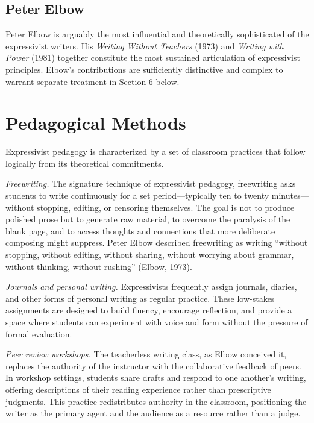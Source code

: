 \documentclass[12pt]{article}
\begin{document}
\subsection{Peter Elbow}

Peter Elbow is arguably the most influential and theoretically sophisticated of the expressivist writers. His \textit{Writing Without Teachers} (1973) and \textit{Writing with Power} (1981) together constitute the most sustained articulation of expressivist principles. Elbow's contributions are sufficiently distinctive and complex to warrant separate treatment in Section 6 below.

\section{Pedagogical Methods}

Expressivist pedagogy is characterized by a set of classroom practices that follow logically from its theoretical commitments.

\textit{Freewriting.} The signature technique of expressivist pedagogy, freewriting asks students to write continuously for a set period---typically ten to twenty minutes---without stopping, editing, or censoring themselves. The goal is not to produce polished prose but to generate raw material, to overcome the paralysis of the blank page, and to access thoughts and connections that more deliberate composing might suppress. Peter Elbow described freewriting as writing ``without stopping, without editing, without sharing, without worrying about grammar, without thinking, without rushing'' (Elbow, 1973).

\textit{Journals and personal writing.} Expressivists frequently assign journals, diaries, and other forms of personal writing as regular practice. These low-stakes assignments are designed to build fluency, encourage reflection, and provide a space where students can experiment with voice and form without the pressure of formal evaluation.

\textit{Peer review workshops.} The teacherless writing class, as Elbow conceived it, replaces the authority of the instructor with the collaborative feedback of peers. In workshop settings, students share drafts and respond to one another's writing, offering descriptions of their reading experience rather than prescriptive judgments. This practice redistributes authority in the classroom, positioning the writer as the primary agent and the audience as a resource rather than a judge.
\end{document}
